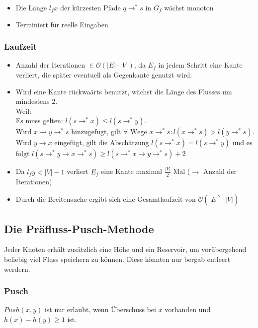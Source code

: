 \begin{itemize}
	\item Die Länge \(l_f x\) der kürzesten Pfade \(q \rightarrow^* s\) in \(G_f\) wächst monoton
	\item Terminiert für reelle Eingaben
\end{itemize}

\subsubsection{Laufzeit}
\begin{itemize}
	\item Anzahl der Iterationen \(\in \mathcal{O}(|E| \cdot |V|)\), da \(E_f\) in jedem Schritt eine Kante verliert, die später eventuell als Gegenkante genutzt wird.
    \item Wird eine Kante rückwaärts benutzt, wächst die Länge des Flusses um mindestens \(2\).\\ Weil:\\
    Es muss gelten: $l(s \rightarrow^{\ast} x) \le l(s \rightarrow^{\ast} y)$.\\
    Wird $x \rightarrow y \rightarrow^{\ast} s$ hinzugefügt, gilt $\forall \text{ Wege } x \rightarrow^{\ast} s : l(x \rightarrow^{\ast} s) > l(y \rightarrow^{\ast} s)$.\\
    Wird $y \rightarrow x$ eingefügt, gilt die Abschätzung $l(s \rightarrow^{\ast} x) = l(s \rightarrow^{\ast} y)$ und es folgt $l(s \rightarrow^{\ast} y \rightarrow x \rightarrow^{\ast} s) \ge l(s \rightarrow^{\ast} x \rightarrow y \rightarrow^{\ast} s)+2$
	\item Da \(l_f y < |V|-1\) verliert \(E_f\) eine Kante maximal \(\frac{|V|}{2}\) Mal (\(\rightarrow\) Anzahl der Iterationen)
	\item Durch die Breitensuche ergibt sich eine Gesamtlaufzeit von \(\mathcal{O}(|E|^2 \cdot |V|)\)
\end{itemize}


\subsection{Die Präfluss-Pusch-Methode}
Jeder Knoten erhält zusätzlich eine Höhe und ein Reservoir, um vorübergehend beliebig viel Fluss speichern zu können. Diese könnten nur bergab entleert werdern.

\subsubsection{Pusch}
\(Push(x,y)\) ist nur erlaubt, wenn Überschuss bei \(x\) vorhanden und \(h(x)-h(y) \geq 1\) ist.


